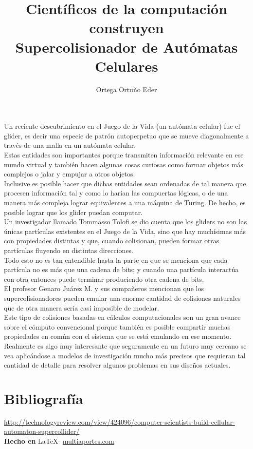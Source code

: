 \documentclass{article}
\title{Científicos de la computación construyen \\Supercolisionador de Autómatas Celulares}
\author{Ortega Ortu\~no Eder}
\date{} %
\begin{document}
	\maketitle
	\normalsize{
Un reciente descubrimiento en el Juego de la Vida (un autómata celular) fue el glider, es decir una especie de patrón autoperpetuo que se mueve diagonalmente a través de una malla en un autómata celular.
\\

Estas entidades son importantes porque transmiten información relevante en ese mundo virtual y también hacen algunas cosas curiosas como formar objetos más complejos o jalar y empujar a otros objetos.
\\

Inclusive es posible hacer que dichas entidades sean ordenadas de tal manera que procesen información tal y como lo harían las compuertas lógicas, o de una manera más compleja lograr equivalentes a una máquina de Turing. De hecho, es posible lograr que los glider puedan computar.
\\

Un investigador llamado Tommasso Tolofi se dio cuenta que los gliders no son las únicas partículas existentes en el Juego de la Vida, sino que hay muchísimas más con propiedades distintas y que, cuando colisionan, pueden formar otras partículas fluyendo en distintas direcciones.
\\

Todo esto no es tan entendible hasta la parte en que se menciona que cada partícula no es más que una cadena de bits; y cuando una partícula interactúa con otra entonces puede terminar produciendo otra cadena de bits.
\\

El profesor Genaro Juárez M. y sus compañeros mencionan que los supercolisionadores pueden emular una enorme cantidad de colisiones naturales que de otra manera sería casi imposible de modelar.
\\

Este tipo de colisiones basadas en cálculos computacionales son un gran avance sobre el cómputo convencional porque también es posible compartir muchas propiedades en común con el sistema que se está emulando en ese momento.
\\

Realmente es algo muy interesante que seguramente en un futuro muy cercano se vea aplicándose a modelos de investigación mucho más precisos que requieran tal cantidad de detalle para resolver algunos problemas en sus diseños actuales.
}

\vspace{2cm}

\section*{Bibliograf\'ia}

\noindent \url{http://technologyreview.com/view/424096/computer-scientists-build-cellular-automaton-supercollider/}
\\

\large{\hfill \textbf{Hecho en } \LaTeX - \url{multiaportes.com}}
\end{document}
